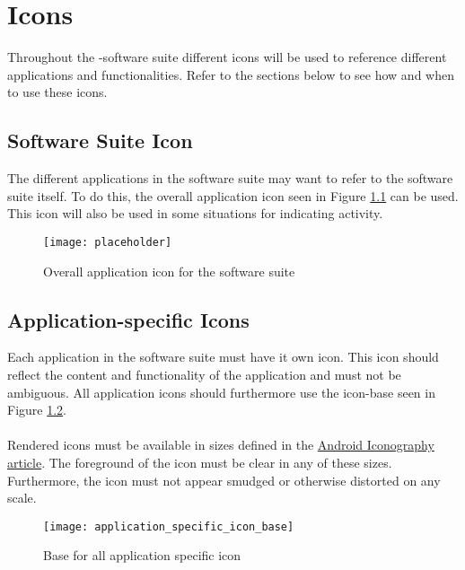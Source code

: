 
\chapter{Icons}

Throughout the \giraf-software suite different icons will be used to reference different applications and functionalities. Refer to the sections below to see how and when to use these icons.

\section{\giraf Software Suite Icon}
The different applications in the \giraf software suite may want to refer to the software suite itself. To do this, the overall application icon seen in Figure \ref{fig:overall_application_icon} can be used. This icon will also be used in some situations for indicating activity. 

\begin{figure}[h]
	\centering
	\texttt{[image: placeholder]}
	\caption{Overall application icon for the \giraf software suite}
	\label{fig:overall_application_icon}
\end{figure}

\section{Application-specific Icons}
Each application in the \giraf software suite must have it own icon. This icon should reflect the content and functionality of the application and must not be ambiguous. All application icons should furthermore use the icon-base seen in Figure \ref{fig:application_specific_icon_base}. 
\\\\
Rendered icons must be available in sizes defined in the \href{http://developer.android.com/design/style/iconography.html}{Android Iconography article}. The foreground of the icon must be clear in any of these sizes. Furthermore, the icon must not appear smudged or otherwise distorted on any scale.

\begin{figure}[h]
	\centering
	\texttt{[image: application\_specific\_icon\_base]}
	\caption{Base for all application specific icon}
	\label{fig:application_specific_icon_base}
\end{figure}

